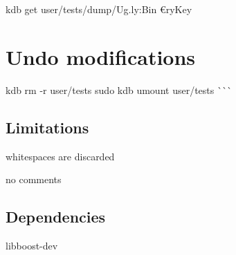 kdb get user/tests/dump/\+Ug.\+ly\+:Bin{\itshape } €ry\+Key\hypertarget{autotoc_md666_autotoc_md681}{}\section{Undo modifications}\label{autotoc_md666_autotoc_md681}
kdb rm -\/r user/tests sudo kdb umount user/tests \`{}\`{}\`{}\hypertarget{autotoc_md666_autotoc_md682}{}\subsection{Limitations}\label{autotoc_md666_autotoc_md682}

\begin{DoxyItemize}
\item whitespaces are discarded
\item no comments
\end{DoxyItemize}\hypertarget{autotoc_md666_autotoc_md683}{}\subsection{Dependencies}\label{autotoc_md666_autotoc_md683}

\begin{DoxyItemize}
\item {\ttfamily libboost-\/dev} 
\end{DoxyItemize}